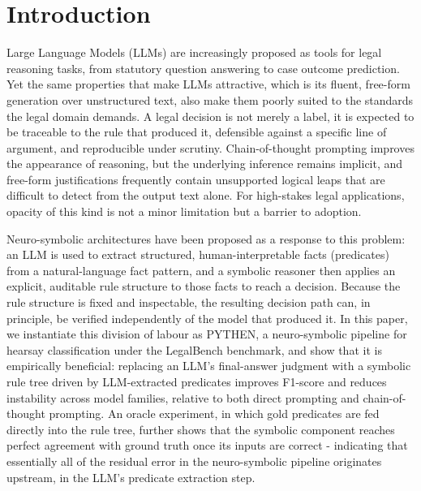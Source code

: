\section{Introduction}
\label{sec:intro}

Large Language Models (LLMs) are increasingly proposed as tools for legal reasoning tasks, from statutory question answering\cite{louis2024interpretable} to case outcome prediction\cite{jiang2023legal}. Yet the same properties that make LLMs attractive, which is its fluent, free-form generation over unstructured text, also make them poorly suited to the standards the legal domain demands\cite{mik2024caveatlectorlargelanguage}. A legal decision is not merely a label, it is expected to be traceable to the rule that produced it, defensible against a specific line of argument, and reproducible under scrutiny. Chain-of-thought prompting improves the appearance of reasoning\cite{yu2023exploring}, but the underlying inference remains implicit, and free-form justifications frequently contain unsupported logical leaps that are difficult to detect from the output text alone\cite{galitsky2026discourse}. For high-stakes legal applications, opacity of this kind is not a minor limitation but a barrier to adoption.

Neuro-symbolic architectures have been proposed as a response to this problem: an LLM is used to extract structured, human-interpretable facts (predicates) from a natural-language fact pattern, and a symbolic reasoner then applies an explicit, auditable rule structure to those facts to reach a decision\cite{yang2025neuro}. Because the rule structure is fixed and inspectable, the resulting decision path can, in principle, be verified independently of the model that produced it. In this paper, we instantiate this division of labour as PYTHEN, a neuro-symbolic pipeline for hearsay classification under the LegalBench benchmark\cite{guha2023legalbench}, and show that it is empirically beneficial: replacing an LLM's final-answer judgment with a symbolic rule tree driven by LLM-extracted predicates improves F1-score and reduces instability across model families, relative to both direct prompting and chain-of-thought prompting. An oracle experiment, in which gold predicates are fed directly into the rule tree, further shows that the symbolic component reaches perfect agreement with ground truth once its inputs are correct - indicating that essentially all of the residual error in the neuro-symbolic pipeline originates upstream, in the LLM's predicate extraction step.

